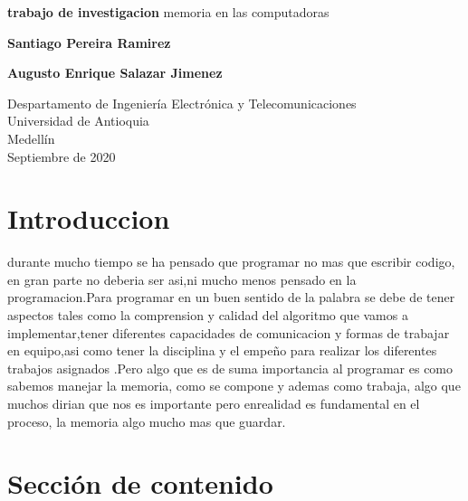 \documentclass{article}
\begin{document}
\begin{titlepage}
    \begin{center}
        \vspace*{1cm}
            
        \Huge
        \textbf{trabajo de investigacion}
        \vspace{0.5cm}
        \LARGE
        memoria en las computadoras
            
        \vspace{1.5cm}
            
        \textbf{Santiago Pereira Ramirez}
        
        
        \vspace{1 cm}
        
        \textbf{Augusto Enrique Salazar Jimenez}
            
        \vfill
            
        \vspace{0.8cm}
            
        \Large
        Despartamento de Ingeniería Electrónica y Telecomunicaciones\\
        Universidad de Antioquia\\
        Medellín\\
        Septiembre de 2020
            
    \end{center}
\end{titlepage}

\tableofcontents

\section{Introduccion}
durante mucho tiempo se ha pensado que programar no mas que  escribir codigo, en gran parte no deberia ser asi,ni mucho menos pensado en la programacion.Para programar en un buen sentido de la palabra se debe de tener aspectos tales como la comprension y calidad del algoritmo que vamos a implementar,tener diferentes capacidades de comunicacion 
y formas de trabajar en equipo,asi como tener la disciplina y el empeño para realizar los diferentes trabajos asignados .Pero algo que es de suma importancia al programar es como sabemos manejar la memoria, como se compone y ademas como trabaja, algo que muchos dirian que nos es importante pero enrealidad es fundamental en el proceso, la memoria algo mucho mas que guardar.


\section{Sección de contenido} \label{contenido}
\end{document}
